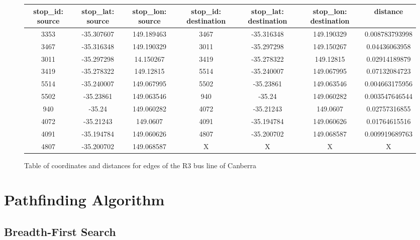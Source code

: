 \documentclass{article}
\begin{document}
\begin{center}
\begin{figure}[h]
\begin{adjustbox}{max width=\textwidth}
\begin{tabular}{ |c|c|c|c|c|c|c| } 
 \hline
 stop\_id: source & stop\_lat: source & stop\_lon: source & stop\_id: destination & stop\_lat: destination & stop\_lon: destination & distance \\ 
 \hline
 3353 & -35.307607 & 149.189463 & 3467 & -35.316348 & 149.190329 & 0.008783793998 \\ 
 \hline
 3467 & -35.316348 & 149.190329 & 3011 & -35.297298 & 149.150267 & 0.04436063958 \\
 \hline
 3011 & -35.297298 & 14.150267 & 3419 & -35.278322 & 149.12815 & 0.02914189879 \\
 \hline
 3419 & -35.278322 & 149.12815 & 5514 & -35.240007 & 149.067995 & 0.07132084723 \\
 \hline
 5514 & -35.240007 & 149.067995 & 5502 & -35.23861 & 149.063546 & 0.004663175956 \\
 \hline
 5502 & -35.23861 & 149.063546 & 940 & -35.24 & 149.060282 & 0.003547646544 \\
 \hline
 940 & -35.24 & 149.060282 & 4072 & -35.21243 & 149.0607 & 0.02757316855 \\
 \hline
 4072 & -35.21243 & 149.0607 & 4091 & -35.194784 & 149.060626 & 0.01764615516 \\
 \hline
 4091 & -35.194784 & 149.060626 & 4807 & -35.200702 & 149.068587 & 0.009919689763 \\
 \hline
 4807 & -35.200702 & 149.068587 & X & X & X & X \\ 
 \hline
\end{tabular}
\end{adjustbox}
\caption{Table of coordinates and distances for edges of the R3 bus line of Canberra}
\end{figure}
\end{center}

\newpage

\section{Pathfinding Algorithm}

\subsection{Breadth-First Search}
\end{document}
